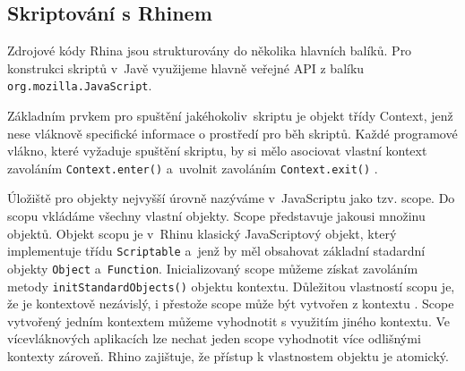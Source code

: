 
\subsection{Skriptování s Rhinem}
\label{Chapter.JavaScriptInJavaAnalysis.Rhino.ScriptingWithRhino}

Zdrojové kódy Rhina jsou strukturovány do několika hlavních balíků. Pro konstrukci skriptů v~Javě využijeme hlavně veřejné API z balíku \texttt{org.mozilla.JavaScript}.

Základním prvkem pro spuštění jakéhokoliv~skriptu je objekt třídy Context, jenž nese vláknově specifické informace o prostředí pro běh skriptů. Každé programové vlákno, které vyžaduje spuštění skriptu, by si mělo asociovat vlastní kontext zavoláním \texttt{Context.enter()} a~uvolnit zavoláním \texttt{Context.exit()} \cite{Bibliography.Rhino.ScopesAndContexts}.

Úložiště pro objekty nejvyšší úrovně nazýváme v~JavaScriptu jako tzv. scope. Do scopu vkládáme všechny vlastní objekty. Scope představuje jakousi množinu objektů. Objekt scopu je v~Rhinu klasický JavaScriptový objekt, který implementuje třídu \texttt{Scriptable} a~jenž by měl obsahovat základní stadardní objekty \texttt{Object} a~\texttt{Function}. Inicializovaný scope můžeme získat zavoláním metody \texttt{initStandardObjects()} objektu kontextu. Důležitou vlastností scopu je, že je kontextově nezávislý, i přestože scope může být vytvořen z kontextu \cite{Bibliography.Rhino.ScopesAndContexts}. Scope vytvořený jedním kontextem můžeme vyhodnotit s využitím jiného kontextu. Ve vícevláknových aplikacích lze nechat jeden scope vyhodnotit více odlišnými kontexty zároveň. Rhino zajištuje, že přístup k vlastnostem objektu je atomický.

